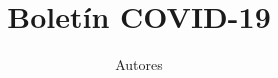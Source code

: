 \documentclass[12pt,a4paper,openany]{book}
\begin{document}
	
	\doublespacing
	
	\title{Boletín COVID-19}
	\author{Autores}
	
	\date{}
	
	
	
	
	\pagestyle{plain}
	
	
	\clearpage
	
	\pagestyle{plain}
	
	\clearpage
	
\end{document}
